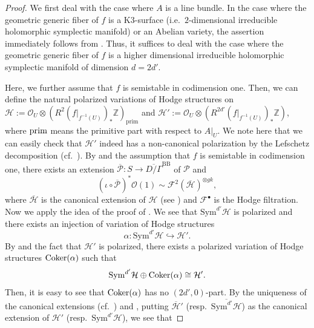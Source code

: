 \documentclass[12pt,twoside]{amsart}
\theoremstyle{definition}
\begin{document}
\begin{proof}
    We first deal with the case where $A$ is a line bundle. 
    In the case where the geometric generic fiber of $f$ is a K$3$-surface (i.e.~$2$-dimensional irreducible holomorphic symplectic manifold) or an Abelian variety, the assertion immediately follows from \cite[Theorem 1.2]{fujino--canonical-certain}.
    Thus, it suffices to deal with the case where the geometric generic fiber of $f$ is a higher dimensional irreducible holomorphic symplectic manifold of dimension $d=2d'$.

   Here, we further assume that $f$ is semistable in codimension one.
   Then, we can define the natural polarized variations of Hodge structures on $\mathcal{H}:=\mathcal{O}_{U}\otimes(R^{2}(f|_{f^{-1}(U)})_*\mathbb{Z})_{\mathrm{prim}}$ and $\mathcal{H}':=\mathcal{O}_{U}\otimes (R^{2d'}(f|_{f^{-1}(U)})_*\mathbb{Z})$, where ${\rm prim}$ means the primitive part with respect to $A|_U$.
   We note here that we can easily check that $\mathcal{H}'$ indeed has a non-canonical polarization by the Lefschetz decomposition (cf.~\cite[The third comment]{kim-can-bundle-formula}). 
   By \cite[Theorem 2.10]{fujino--canonical-certain} and the assumption that $f$ is semistable in codimension one, there exists an extension $\overline{\mathcal{P}}\colon S\to \overline{ D/\Gamma}^{\mathrm{BB}}$ of $\mathcal{P}$ and 
   \begin{equation*}\tag{$*$}\label{eq--linear--equiv--Fujino-Kim-1}
  (\iota\circ\overline{\mathcal{P}})^*\mathcal{O}(1)\sim \mathscr{F}^2(\overline{\mathcal{H}})^{\otimes gk},
   \end{equation*}
   where $\overline{\mathcal{H}}$ is the canonical extension of $\mathcal{H}$ (see \cite{fujino--canonical-certain}) and $\mathscr{F}^\bullet$ is the Hodge filtration.
   Now we apply the idea of the proof of \cite[Theorem 1.1]{kim-can-bundle-formula}. 
   We see that $\mathrm{Sym}^{d'}\mathcal{H}$ is polarized and there exists an injection of variation of Hodge structures
   \[
  \alpha\colon  \mathrm{Sym}^{d'}\mathcal{H}\hookrightarrow \mathcal{H}'.
   \]
   By \cite[Theorem 10.13]{PS} and the fact that $\mathcal{H}'$ is polarized, there exists a polarized variation of Hodge structures ${\rm Coker}(\alpha)$ such that 
    \[
   \mathrm{Sym}^{d'}\mathcal{H}\oplus {\rm Coker}(\alpha)\cong \mathcal{H}'.
   \]
   Then, it is easy to see that ${\rm Coker}(\alpha)$ has no $(2d',0)$-part.
   By the uniqueness of the canonical extensions (cf.~\cite{fujino--canonical-certain}) and \cite[Lemma 3.1]{kim-can-bundle-formula}, putting $\overline{\mathcal{H}}'$ (resp.~$\overline{\mathrm{Sym}^{d'}\mathcal{H}}$) as the canonical extension of $\mathcal{H}'$ (resp.~$\mathrm{Sym}^{d'}\mathcal{H}$), we see that 

\end{proof}
\end{document}

